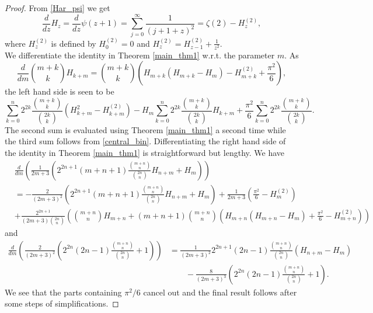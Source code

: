 \documentclass[11pt,reqno]{amsart}
\theoremstyle{plain}
\numberwithin{equation}{section}
\begin{document}
\begin{proof}
From \eqref{Har_psi} we get
$$\frac{d}{dz} H_z = \frac{d}{dz} \psi(z+1) = \sum_{j=0}^\infty \frac{1}{(j+1+z)^2} = \zeta(2) - H_z^{(2)},$$
where $H_z^{(2)}$ is defined by $H_0^{(2)}=0$ and $H_z^{(2)}=H_{z-1}^{(2)}+\frac{1}{z^2}$.\\
We differentiate the identity in Theorem \ref{main_thm1} w.r.t. the parameter $m$. As
$$\frac{d}{dm} \binom{m+k}{k}H_{k+m} = \binom{m+k}{k}\left (H_{m+k}(H_{m+k}-H_m) - H_{m+k}^{(2)} + \frac{\pi^2}{6}\right ),$$
the left hand side is seen to be
$$\sum_{k=0}^n 2^{2k} \frac{\binom{m+k}{k}}{\binom{2k}{k}}\left ( H_{k+m}^2 - H_{k+m}^{(2)}\right ) - H_m \sum_{k=0}^n 2^{2k} \frac{\binom{m+k}{k}}{\binom{2k}{k}}H_{k+m} + \frac{\pi^2}{6} \sum_{k=0}^n 2^{2k} \frac{\binom{m+k}{k}}{\binom{2k}{k}}.$$ 
The second sum is evaluated using Theorem \ref{main_thm1} a second time while the third sum follows from \eqref{central_bin}. Differentiating the right hand side of the identity in Theorem \ref{main_thm1} is straightforward but lengthy. We have
\begin{align*}
&\frac{d}{dm} \left (\frac{1}{2m+3}\left ( 2^{2n+1} (m+n+1)\frac{\binom{m+n}{n}}{\binom{2n}{n}} H_{n+m} + H_m \right )\right ) \\ 
&= - \frac{2}{(2m+3)^2} \left( 2^{2n+1} (m+n+1)\frac{\binom{m+n}{n}}{\binom{2n}{n}} H_{n+m} + H_m \right ) 
+ \frac{1}{2m+3}\left (\frac{\pi^2}{6} - H_m^{(2)} \right ) \\
& + \frac{2^{2n+1}}{(2m+3)\binom{2n}{n}}\left (\binom{m+n}{n} H_{m+n} + (m+n+1)\binom{m+n}{n}\left (H_{m+n}(H_{m+n}-H_m) 
+ \frac{\pi^2}{6} - H_{m+n}^{(2)} \right )\right )
\end{align*}
and
\begin{align*}
\frac{d}{dm} \left (\frac{2}{(2m+3)^2} \left (2^{2n} (2n-1)\frac{\binom{m+n}{n}}{\binom{2n}{n}} + 1\right )\right )
&= \frac{1}{(2m+3)^2} 2^{2n+1} (2n-1) \frac{\binom{m+n}{n}}{\binom{2n}{n}}( H_{n+m} - H_m ) \\
&\qquad - \frac{8}{(2m+3)^3} \left (2^{2n} (2n-1)\frac{\binom{m+n}{n}}{\binom{2n}{n}} + 1\right ).
\end{align*}
We see that the parts containing $\pi^2/6$ cancel out and the final result follows after some steps of simplifications.
\end{proof}
\end{document}
